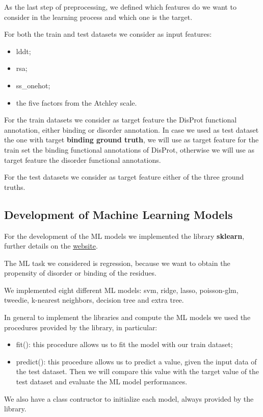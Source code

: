 As the last step of preprocessing, we defined which features do we want to consider in the learning process and which one is the target. 

For both the train and test datasets we consider as input features:
\begin{itemize}
    \item lddt;
    \item rsa;
    \item ss\_onehot;
    \item the five factors from the Atchley scale.
\end{itemize}
For the train datasets we consider as target feature the DisProt functional annotation, either binding or disorder annotation. In case we used as test dataset the one with target \textbf{binding ground truth}, we will use as target feature for the train set the binding functional annotations of DisProt, otherwise we will use as target feature the disorder functional annotations.

For the test datasets we consider as target feature either of the three ground truths.

\subsection{Development of Machine Learning Models}
For the development of the ML models we implemented the library \textbf{sklearn}, further details on the \href{https://scikit-learn.org/stable/}{\underline{website}}.

The ML task we considered is regression, because we want to obtain the propensity of disorder or binding of the residues.

We implemented eight different ML models: svm, ridge, lasso, poisson-glm, tweedie, k-nearest neighbors, decision tree and extra tree. 

In general to implement the libraries and compute the ML models we used the procedures provided by the library, in particular:
\begin{itemize}
    \item fit(): this procedure allows us to fit the model with our train dataset;
    \item predict(): this procedure allows us to predict a value, given the input data of the test dataset. Then we will compare this value with the target value of the test dataset and evaluate the ML model performances.
\end{itemize}
We also have a class contructor to initialize each model, always provided by the library.

